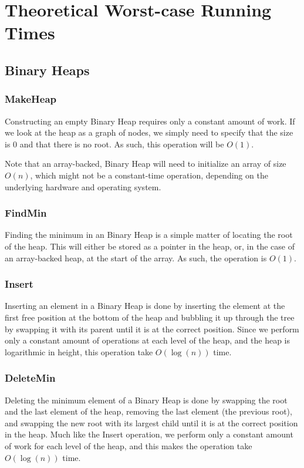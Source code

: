 \section{Theoretical Worst-case Running Times}
\subsection{Binary Heaps}
\subsubsection{MakeHeap}
Constructing an empty Binary Heap requires only a constant amount of work. If we look at the heap as a graph of nodes, we simply need to specify that the size is 0 and that there is no root. As such, this operation will be $O(1)$.

Note that an array-backed, Binary Heap will need to initialize an array of size $O(n)$, which might not be a constant-time operation, depending on the underlying hardware and operating system.

\subsubsection{FindMin}
Finding the minimum in an Binary Heap is a simple matter of locating the root of the heap. This will either be stored as a pointer in the heap, or, in the case of an array-backed heap, at the start of the array. As such, the operation is $O(1)$.

\subsubsection{Insert}
Inserting an element in a Binary Heap is done by inserting the element at the first free position at the bottom of the heap and bubbling it up through the tree by swapping it with its parent until it is at the correct position. Since we perform only a constant amount of operations at each level of the heap, and the heap is logarithmic in height, this operation take $O(\log (n))$ time.

\subsubsection{DeleteMin}
Deleting the minimum element of a Binary Heap is done by swapping the root and the last element of the heap, removing the last element (the previous root), and swapping the new root with its largest child until it is at the correct position in the heap. Much like the Insert operation, we perform only a constant amount of work for each level of the heap, and this makes the operation take $O(\log (n))$ time.

